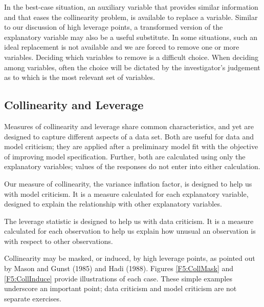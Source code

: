 
In the best-case situation, an auxiliary variable that provides
similar information and that eases the collinearity problem, is
available to replace a variable. Similar to our discussion of high
leverage points, a transformed version of the explanatory variable
may also be a useful substitute. In some situations, such an ideal
replacement is not available and we are forced to remove one or more
variables. Deciding which variables to remove is a difficult choice.
When deciding among variables, often the choice will be dictated by
the investigator's judgement as to which is the most relevant set of
variables.

\subsection{Collinearity and
Leverage}

Measures of collinearity and leverage share common characteristics, and yet
are designed to capture different aspects of a data set. Both are useful for
data and model criticism; they are applied after a preliminary model fit
with the objective of improving model specification. Further, both are
calculated using only the explanatory variables; values of the responses do
not enter into either calculation.

Our measure of collinearity, the variance inflation factor, is designed to
help us with model criticism. It is a measure calculated for each
explanatory variable, designed to explain the relationship with other
explanatory variables.

The leverage statistic is designed to help us with data criticism. It is a
measure calculated for each observation to help us explain how unusual an
observation is with respect to other observations.

Collinearity may be masked, or induced, by high leverage points, as
pointed out by Mason and Gunst (1985) and Hadi (1988). Figures
\ref{F5:CollMask} and \ref{F5:CollInduce} provide illustrations of
each case. These simple examples underscore an important point; data
criticism and model criticism are not separate exercises.


